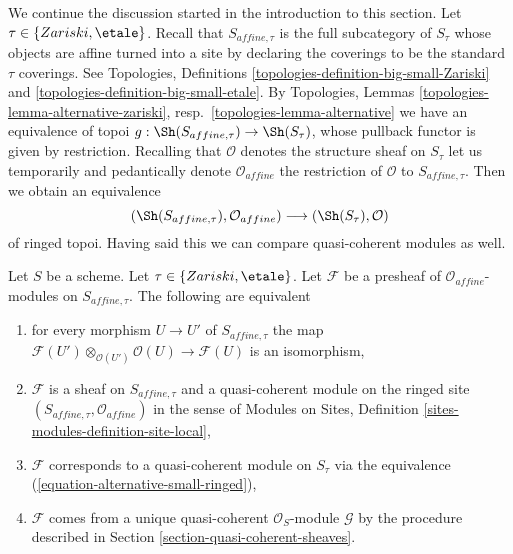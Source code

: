 \noindent
We continue the discussion started in the introduction to this section.
Let $\tau \in \{Zariski, \etale\}$. Recall that $S_{affine, \tau}$
is the full subcategory of $S_\tau$ whose objects are affine turned
into a site by declaring the coverings to be the standard $\tau$
coverings. See Topologies, Definitions
\ref{topologies-definition-big-small-Zariski} and
\ref{topologies-definition-big-small-etale}.
By Topologies, Lemmas \ref{topologies-lemma-alternative-zariski},
resp.\  \ref{topologies-lemma-alternative}
we have an equivalence of topoi $g : \Sh(S_{affine, \tau}) \to \Sh(S_\tau)$,
whose pullback functor is given by restriction.
Recalling that $\mathcal{O}$ denotes the structure sheaf on
$S_\tau$ let us temporarily and pedantically denote
$\mathcal{O}_{affine}$ the restriction of $\mathcal{O}$ to
$S_{affine, \tau}$. Then we obtain an equivalence
\begin{equation}
\label{equation-alternative-small-ringed}
(\Sh(S_{affine, \tau}), \mathcal{O}_{affine})
\longrightarrow
(\Sh(S_\tau), \mathcal{O})
\end{equation}
of ringed topoi. Having said this we can compare quasi-coherent modules
as well.

\begin{lemma}
\label{lemma-quasi-coherent-alternative-small}
Let $S$ be a scheme. Let $\tau \in \{Zariski, \etale\}$.
Let $\mathcal{F}$ be a presheaf of $\mathcal{O}_{affine}$-modules
on $S_{affine, \tau}$. The following are equivalent
\begin{enumerate}
\item for every morphism $U \to U'$ of $S_{affine, \tau}$ the map
$\mathcal{F}(U') \otimes_{\mathcal{O}(U')} \mathcal{O}(U) \to \mathcal{F}(U)$
is an isomorphism,
\item $\mathcal{F}$ is a sheaf on $S_{affine, \tau}$ and
a quasi-coherent module on the ringed site
$(S_{affine, \tau}, \mathcal{O}_{affine})$ in the sense of
Modules on Sites, Definition \ref{sites-modules-definition-site-local},
\item $\mathcal{F}$ corresponds to a quasi-coherent module on
$S_\tau$ via the equivalence (\ref{equation-alternative-small-ringed}),
\item $\mathcal{F}$ comes from a unique quasi-coherent
$\mathcal{O}_S$-module $\mathcal{G}$ by the procedure
described in Section \ref{section-quasi-coherent-sheaves}.
\end{enumerate}
\end{lemma}

